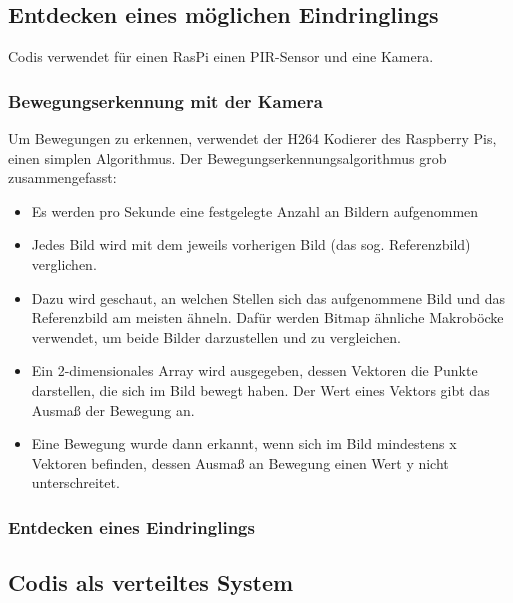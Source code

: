 \documentclass[journal]{IEEEtran}
\begin{document}
\subsection{Entdecken eines möglichen Eindringlings}

Codis verwendet für einen RasPi einen PIR-Sensor und eine Kamera. 

\subsubsection{Bewegungserkennung mit der Kamera}

Um Bewegungen zu erkennen, verwendet der H264 Kodierer des Raspberry Pis, einen simplen Algorithmus\cite{vektoren}. Der Bewegungserkennungsalgorithmus grob zusammengefasst:

\begin{itemize}
\item Es werden pro Sekunde eine festgelegte Anzahl an Bildern aufgenommen
\item Jedes Bild wird mit dem jeweils vorherigen Bild (das sog. Referenzbild) verglichen.
\item Dazu wird geschaut, an welchen Stellen sich das aufgenommene Bild und das Referenzbild am meisten ähneln. Dafür werden Bitmap ähnliche Makroböcke verwendet, um beide Bilder darzustellen und zu vergleichen.
\item Ein 2-dimensionales Array wird ausgegeben, dessen Vektoren die Punkte darstellen, die sich im Bild bewegt haben. Der Wert eines Vektors gibt das Ausmaß der Bewegung an.
\item Eine Bewegung wurde dann erkannt, wenn sich im Bild mindestens x Vektoren befinden, dessen Ausmaß an Bewegung einen Wert y nicht unterschreitet.
\end{itemize}

\subsubsection{Entdecken eines Eindringlings}


\subsection{Codis als verteiltes System}
\end{document}
